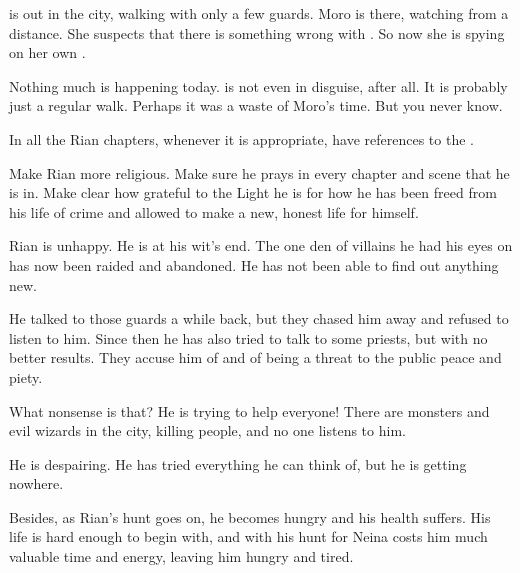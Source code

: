
\begin{comment}
  \section{Moro spies on \Tiroco}
\end{comment}

\Tiroco is out in the city, walking with only a few guards. 
Moro \Cornel is there, watching \Tiroco from a distance.
She suspects that there is something wrong with \Tiroco. 
So now she is spying on her own \rinyuth. 

Nothing much is happening today. 
\Tiroco is not even in disguise, after all. 
It is probably just a regular walk. 
Perhaps it was a waste of Moro's time. 
But you never know.
    
In all the Rian chapters, whenever it is appropriate, have references to the . 

Make Rian more religious.
Make sure he prays in every chapter and scene that he is in.
Make clear how grateful to the Light he is for how he has been freed from his life of crime and allowed to make a new, honest life for himself.





\begin{comment}
  \section{Rian thinks}
\end{comment}
\new
Rian is unhappy.
He is at his wit's end. 
The one den of villains he had his eyes on has now been raided and abandoned. 
He has not been able to find out anything new. 

He talked to those guards a while back, but they chased him away and refused to listen to him.
Since then he has also tried to talk to some priests, but with no better results. 
They accuse him of  and of being a threat to the public peace and piety. 

What nonsense is that? 
He is trying to help everyone!
There are monsters and evil wizards in the city, killing people, and no one listens to him. 

He is despairing. 
He has tried everything he can think of, but he is getting nowhere. 

Besides, as Rian's hunt goes on, he becomes hungry and his health suffers.
His life is hard enough to begin with, and with his hunt for Neina costs him much valuable time and energy, leaving him hungry and tired. 

